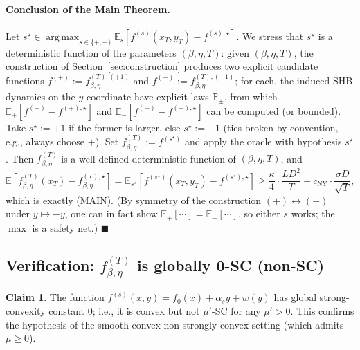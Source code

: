 \documentclass[11pt]{article}
\theoremstyle{definition}
\newtheorem{claim}[theorem]{Claim}
\theoremstyle{remark}
\DeclareMathOperator*{\argmax}{arg\,max}
\begin{document}
\paragraph{Conclusion of the Main Theorem.} Let $s^\star \in \argmax_{s \in \{+,-\}} \mathbb{E}_s[f^{(s)}(x_T, y_T) - f^{(s),\star}]$. We stress that $s^\star$ is a deterministic function of the parameters $(\beta, \eta, T)$: given $(\beta, \eta, T)$, the construction of Section~\ref{sec:construction} produces two explicit candidate functions $f^{(+)} := f_{\beta,\eta}^{(T),(+1)}$ and $f^{(-)} := f_{\beta,\eta}^{(T),(-1)}$; for each, the induced SHB dynamics on the $y$-coordinate have explicit laws $\mathbb{P}_\pm$, from which $\mathbb{E}_+[f^{(+)} - f^{(+),\star}]$ and $\mathbb{E}_-[f^{(-)} - f^{(-),\star}]$ can be computed (or bounded). Take $s^\star := +1$ if the former is larger, else $s^\star := -1$ (ties broken by convention, e.g., always choose $+$). Set $f_{\beta,\eta}^{(T)} := f^{(s^\star)}$ and apply the oracle with hypothesis $s^\star$. Then $f_{\beta,\eta}^{(T)}$ is a well-defined deterministic function of $(\beta,\eta,T)$, and
\[
  \mathbb{E}[f_{\beta,\eta}^{(T)}(x_T) - f_{\beta,\eta}^{(T),\star}] = \mathbb{E}_{s^\star}[f^{(s^\star)}(x_T, y_T) - f^{(s^\star),\star}] \geq \frac{\kappa}{4}\cdot\frac{LD^2}{T} + c_{\mathrm{NY}}\cdot\frac{\sigma D}{\sqrt T},
\]
which is exactly (MAIN). (By symmetry of the construction $(+) \leftrightarrow (-)$ under $y \mapsto -y$, one can in fact show $\mathbb{E}_+[\cdots] = \mathbb{E}_-[\cdots]$, so either $s$ works; the $\max$ is a safety net.) $\blacksquare$

\subsection{Verification: \texorpdfstring{$f_{\beta,\eta}^{(T)}$}{f} is globally 0-SC (non-SC)}

\begin{claim}
\label{cl:zero-sc}
The function $f^{(s)}(x, y) = f_0(x) + \alpha_s y + w(y)$ has global strong-convexity constant $0$; i.e., it is convex but not $\mu'$-SC for any $\mu' > 0$. This confirms the hypothesis of the smooth convex non-strongly-convex setting (which admits $\mu \geq 0$).
\end{claim}
\end{document}
